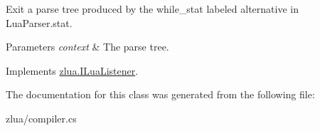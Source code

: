 Exit a parse tree produced by the {\ttfamily while\+\_\+stat} labeled alternative in Lua\+Parser.\+stat. 


\begin{DoxyParams}{Parameters}
{\em context} & The parse tree.\\
\hline
\end{DoxyParams}


Implements \mbox{\hyperlink{interfacezlua_1_1_i_lua_listener_ab7cdf0dd588b664e1f8efbca0a03884e}{zlua.\+I\+Lua\+Listener}}.



The documentation for this class was generated from the following file\+:\begin{DoxyCompactItemize}
\item 
zlua/compiler.\+cs\end{DoxyCompactItemize}
